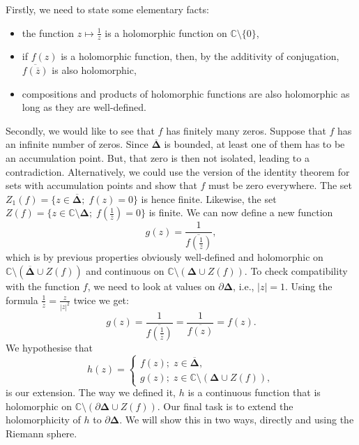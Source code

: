 \documentclass[a4paper, 12pt]{article} %
\newcommand{\C}{\mathbb{C}}
\newcommand{\closure}[1]{\overline{#1}}
\begin{document}
Firstly, we need to state some elementary facts:
\begin{itemize}
\item the function $z \mapsto \frac{1}{z}$ is a holomorphic function on $\C\setminus\lbrace 0 \rbrace$,
\item if $f(z)$ is a holomorphic function, then, by the additivity of conjugation, $\overline{f(\overline{z})}$ is also holomorphic,
\item compositions and products of holomorphic functions are also holomorphic as long as they are well-defined.
\end{itemize}
Secondly, we would like to see that $f$ has finitely many zeros. Suppose that $f$ has an infinite number of zeros. Since $\closure{\mathbf{\Delta}}$ is bounded, at least one of them has to be an accumulation point. But, that zero is then not isolated, leading to a contradiction. Alternatively, we could use the version of the identity theorem for sets with accumulation points and show that $f$ must be zero everywhere. The set $Z_1(f) = \lbrace z \in \closure{\mathbf{\Delta}} ;\; f(z) = 0\rbrace$ is hence finite. Likewise, the set $Z(f) = \lbrace z \in \C\setminus\mathbf{\Delta} ;\; f(\frac{1}{\overline{z}}) = 0 \rbrace$ is finite.
We can now define a new function
\[
g(z) = \frac{1}{\overline{f(\frac{1}{\overline{z}})}},
\]
which is by previous properties obviously well-defined and holomorphic on $\C\setminus(\closure{\mathbf{\Delta}}\cup Z(f))$ and continuous on $\C\setminus(\mathbf{\Delta} \cup Z(f))$.
To check compatibility with the function $f$, we need to look at values on $\partial\mathbf{\Delta}$, i.e., $|z| = 1$. Using the formula $\frac{1}{\overline{z}} = \frac{z}{|z|^2}$ twice we get:
\[
g(z) = \frac{1}{\overline{f(\frac{1}{\overline{z}})}} = \frac{1}{\overline{f(z)}} = f(z).
\]
We hypothesise that
\[
h(z) =
\begin{cases}
f(z);\; z \in \closure{\mathbf{\Delta}},\\
g(z);\; z \in \C\setminus(\mathbf{\Delta} \cup Z(f)),
\end{cases}
\]
is our extension. The way we defined it, $h$ is a continuous function that is holomorphic on $\C\setminus(\partial\mathbf{\Delta}\cup Z(f))$. Our final task is to extend the holomorphicity of $h$ to $\partial\mathbf{\Delta}$. We will show this in two ways, directly and using the Riemann sphere.
\end{document}
